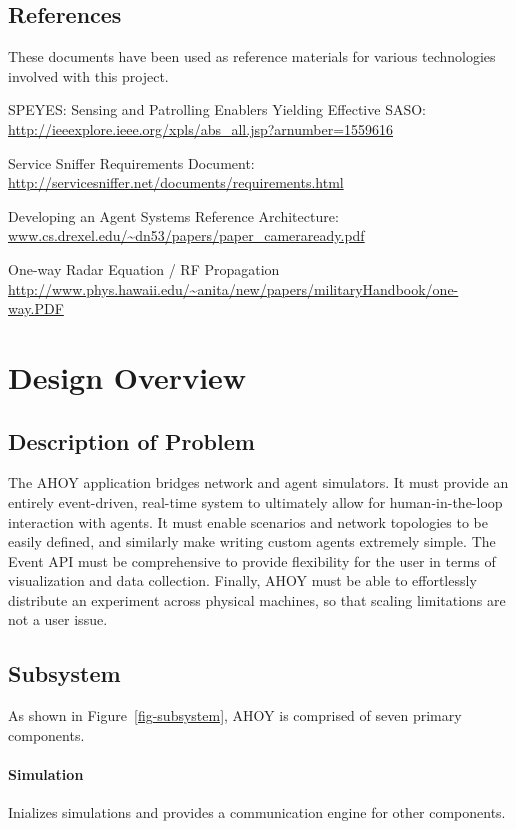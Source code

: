 \documentclass[titlepage]{article}
\renewenvironment{itemize*}
    {\begin{itemize}
        \setlength{\itemsep}{0pt}%
        \setlength{\parskip}{0pt}%
        \setlength{\partopsep}{0pt}%
        \setlength{\topsep}{0pt}}%
    {\end{itemize}}
\begin{document}
\subsection{References%
  \label{references}%
}

These documents have been used as reference materials for various technologies involved with this project.
%
\begin{itemize*}
	\item SPEYES: Sensing and Patrolling Enablers Yielding Effective SASO: \url{http://ieeexplore.ieee.org/xpls/abs_all.jsp?arnumber=1559616}
	\item Service Sniffer Requirements Document: \url{http://servicesniffer.net/documents/requirements.html}
    \item Developing an Agent Systems Reference Architecture: \url{www.cs.drexel.edu/~dn53/papers/paper_cameraready.pdf}
    \item One-way Radar Equation / RF Propagation \url{http://www.phys.hawaii.edu/~anita/new/papers/militaryHandbook/one-way.PDF}
\end{itemize*}

\section{Design Overview}
\subsection{Description of Problem}
The AHOY application bridges network and agent simulators. It must provide an entirely event-driven, real-time system to ultimately allow for human-in-the-loop interaction with agents. It must enable scenarios and network topologies to be easily defined, and similarly make writing custom agents extremely simple. The Event API must be comprehensive to provide flexibility for the user in terms of visualization and data collection. Finally, AHOY must be able to effortlessly distribute an experiment across physical machines, so that scaling limitations are not a user issue.

\subsection{Subsystem}
As shown in Figure~\ref{fig-subsystem}, AHOY is comprised of seven primary components.

\paragraph{Simulation}{Inializes simulations and provides a communication engine for other components.}
\end{document}
